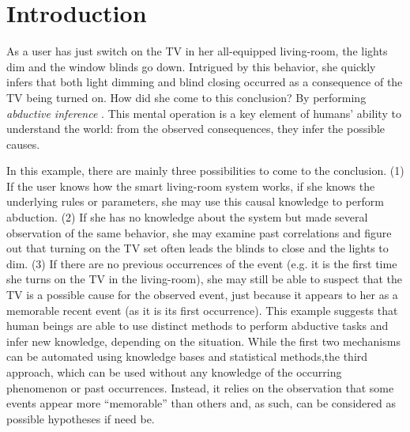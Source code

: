 \documentclass[entropy,article,submit,moreauthors,pdftex]{Definitions/mdpi}
\begin{document}

\section{Introduction}
\label{sec:introduction}

As a user has just switch on the TV in her all-equipped living-room, the
lights dim and the window blinds go down. Intrigued by this behavior, she
quickly infers that both light dimming and blind closing occurred as a
consequence of the TV being turned on. How did she come to this conclusion?
By performing \emph{abductive inference} \cite{magnani_abduction_2011}. This mental operation
is a key element of humans' ability to understand the world: from the
observed consequences, they infer the possible causes.

In this example, there are mainly three possibilities to come to the
conclusion. (1) If the user knows how the smart living-room system works, if she
knows the underlying rules or parameters, she may use this causal
knowledge to perform abduction. (2) If she has no knowledge
about the system but made several observation of the same behavior, she may examine past
correlations and figure out that turning on the TV set often leads the blinds to
close and the lights to dim. (3) If there are no previous occurrences of the event (e.g. it is the first time she turns on the TV
in the living-room), she may still be able to
suspect that the TV is a possible cause for the observed event, just because it appears to her as a memorable recent event (as it is its first occurrence). This example
suggests that human beings are able to use distinct methods to perform abductive tasks
and infer new knowledge, depending on the situation. While the first two mechanisms can be
automated using knowledge bases and statistical methods,the third approach, which can be used without any knowledge of the occurring phenomenon or past occurrences. Instead, it relies on the observation that some events appear more ``memorable'' than others and, as such, can be considered as possible hypotheses if need be.\cite{magnani_abduction_2011}
\end{document}
